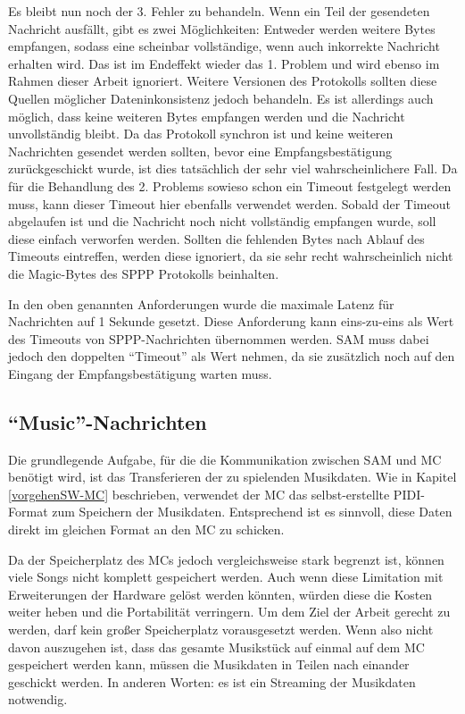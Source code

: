 Es bleibt nun noch der 3. Fehler zu behandeln.
Wenn ein Teil der gesendeten Nachricht ausfällt, gibt es zwei Möglichkeiten: \newline
Entweder werden weitere Bytes empfangen, sodass eine scheinbar vollständige, wenn auch inkorrekte Nachricht erhalten wird.
Das ist im Endeffekt wieder das 1. Problem und wird ebenso im Rahmen dieser Arbeit ignoriert.
Weitere Versionen des Protokolls sollten diese Quellen möglicher Dateninkonsistenz jedoch behandeln. \newline
Es ist allerdings auch möglich, dass keine weiteren Bytes empfangen werden und die Nachricht unvollständig bleibt.
Da das Protokoll synchron ist und keine weiteren Nachrichten gesendet werden sollten, bevor eine Empfangsbestätigung zurückgeschickt wurde, ist dies tatsächlich der sehr viel wahrscheinlichere Fall.
Da für die Behandlung des 2. Problems sowieso schon ein Timeout festgelegt werden muss, kann dieser Timeout hier ebenfalls verwendet werden.
Sobald der Timeout abgelaufen ist und die Nachricht noch nicht vollständig empfangen wurde, soll diese einfach verworfen werden.
Sollten die fehlenden Bytes nach Ablauf des Timeouts eintreffen, werden diese ignoriert, da sie sehr recht wahrscheinlich nicht die Magic-Bytes des \ac{SPPP} Protokolls beinhalten.

In den oben genannten Anforderungen wurde die maximale Latenz für Nachrichten auf 1 Sekunde gesetzt.
Diese Anforderung kann eins-zu-eins als Wert des Timeouts von \ac{SPPP}-Nachrichten übernommen werden.
\ac{SAM} muss dabei jedoch den doppelten \enquote{Timeout} als Wert nehmen, da sie zusätzlich noch auf den Eingang der Empfangsbestätigung warten muss.


\subsection{\enquote{Music}-Nachrichten} \label{SPPP-Pidi-Messages}

Die grundlegende Aufgabe, für die die Kommunikation zwischen \ac{SAM} und \ac{MC} benötigt wird, ist das Transferieren der zu spielenden Musikdaten.
Wie in Kapitel \ref{vorgehenSW-MC} beschrieben, verwendet der \ac{MC} das selbst-erstellte \ac{PIDI}-Format zum Speichern der Musikdaten.
Entsprechend ist es sinnvoll, diese Daten direkt im gleichen Format an den \ac{MC} zu schicken.

Da der Speicherplatz des \ac{MC}s jedoch vergleichsweise stark begrenzt ist, können viele Songs nicht komplett gespeichert werden.
Auch wenn diese Limitation mit Erweiterungen der Hardware gelöst werden könnten, würden diese die Kosten weiter heben und die Portabilität verringern.
Um dem Ziel der Arbeit gerecht zu werden, darf kein großer Speicherplatz vorausgesetzt werden. \newline
Wenn also nicht davon auszugehen ist, dass das gesamte Musikstück auf einmal auf dem \ac{MC} gespeichert werden kann, müssen die Musikdaten in Teilen nach einander geschickt werden.
In anderen Worten: es ist ein Streaming der Musikdaten notwendig.

